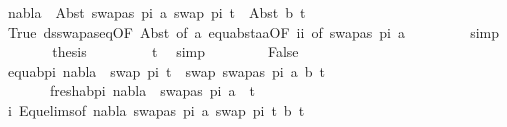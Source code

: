 \begin{isabellebody}
\ {\isachardoublequoteopen}nabla\ {\isasymturnstile}\ Abst\ {\isacharparenleft}{\kern0pt}swapas\ pi{}\ a{\isacharparenright}{\kern0pt}\ {\isacharparenleft}{\kern0pt}swap\ pi{}\ t{}{\isacharprime}{\kern0pt}{\isacharparenright}{\kern0pt}\ {\isasymapprox}\ Abst\ b\ t{}{\isacharprime}{\kern0pt}{\isachardoublequoteclose}\isanewline
\ \ \ \ \ \ \isamarkupfalse%
\ True\ ds{\isacharunderscore}{\kern0pt}swapas{\isacharunderscore}{\kern0pt}eq{\isacharbrackleft}{\kern0pt}OF\ Abst{\isacharparenleft}{\kern0pt}{}{\isacharparenright}{\kern0pt}{\isacharcomma}{\kern0pt}\ of\ a{\isacharbrackright}{\kern0pt}\ equ{\isacharunderscore}{\kern0pt}abst{\isacharunderscore}{\kern0pt}aa{\isacharbrackleft}{\kern0pt}OF\ ii{\isacharcomma}{\kern0pt}\ of\ {\isacartoucheopen}swapas\ pi{}\ a{\isacartoucheclose}{\isacharbrackright}{\kern0pt}\ \isanewline
\ \ \ \ \ \ \isamarkupfalse%
\ simp\isanewline
\ \ \ \ \isamarkupfalse%
\ \isamarkupfalse%
\ {\isacharquery}{\kern0pt}thesis\ \isanewline
\ \ \ \ \ \ \isamarkupfalse%
\ t{}\ \isamarkupfalse%
\ simp\isanewline
\ \ \isamarkupfalse%
\isanewline
\ \ \ \ \isamarkupfalse%
\ False\isanewline
\ \ \ \ \isamarkupfalse%
\ \isamarkupfalse%
\ equ{\isacharunderscore}{\kern0pt}ab{\isacharunderscore}{\kern0pt}pi{}{\isacharcolon}{\kern0pt}\ {\isachardoublequoteopen}nabla\ {\isasymturnstile}\ swap\ pi{}\ t{}{\isacharprime}{\kern0pt}\ {\isasymapprox}\ swap\ {\isacharbrackleft}{\kern0pt}{\isacharparenleft}{\kern0pt}swapas\ pi{}\ a{\isacharcomma}{\kern0pt}\ b{\isacharparenright}{\kern0pt}{\isacharbrackright}{\kern0pt}\ t{}{\isacharprime}{\kern0pt}{\isachardoublequoteclose}\ \isanewline
\ \ \ \ \ \ \ fresh{\isacharunderscore}{\kern0pt}ab{\isacharunderscore}{\kern0pt}pi{}{\isacharcolon}{\kern0pt}\ {\isachardoublequoteopen}nabla\ {\isasymturnstile}\ swapas\ pi{}\ a\ {\isasymsharp}\ t{}{\isacharprime}{\kern0pt}{\isachardoublequoteclose}\isanewline
\ \ \ \ \ \ \isamarkupfalse%
\ i\ Equ{\isacharunderscore}{\kern0pt}elims{\isacharparenleft}{\kern0pt}{}{\isacharparenright}{\kern0pt}{\isacharbrackleft}{\kern0pt}of\ nabla\ {\isacartoucheopen}swapas\ pi{}\ a{\isacartoucheclose}\ {\isacartoucheopen}swap\ pi{}\ t{}{\isacharprime}{\kern0pt}{\isacartoucheclose}\ b\ t{}{\isacharprime}{\kern0pt}{\isacharbrackright}{\kern0pt}\ \isanewline

\end{isabellebody}
